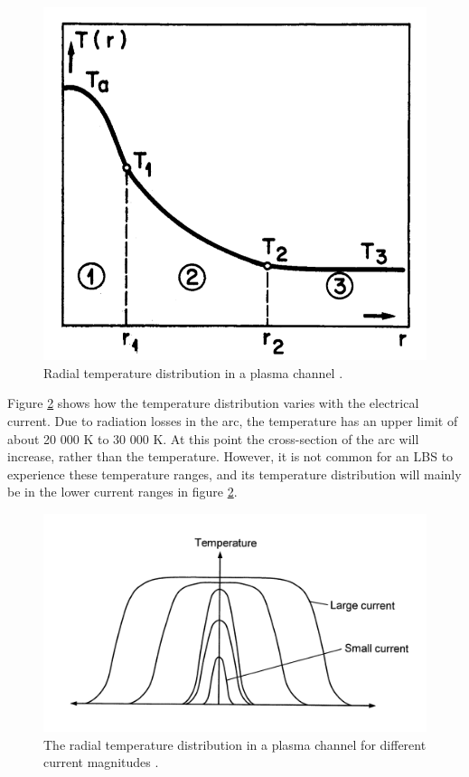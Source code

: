 \documentclass[10pt,b5paper,twoside]{article}
\begin{document}
\begin{figure}[H]
\centering
\includegraphics[scale=0.25]{Bilder/Theory/tempZonesArc.png}
\caption{Radial temperature distribution in a plasma channel \cite{bib:TDCIGBB}.} \label{fig:tempDist1}
\end{figure}

Figure \ref{fig:tempDist2} shows how the temperature distribution varies with the electrical current. Due to radiation losses in the arc, the temperature has an upper limit of about 20 000 K to 30 000 K. At this point the cross-section of the arc will increase, rather than the temperature. However, it is not common for an LBS to experience these temperature ranges, and its temperature distribution will mainly be in the lower current ranges in figure \ref{fig:tempDist2}.

\begin{figure}[H]
\centering
\includegraphics[scale=0.85]{Bilder/Theory/plasmaChannel1.png}
\caption{The radial temperature distribution in a plasma channel for different current magnitudes \cite{bib:HVEbreak}.} \label{fig:tempDist2}
\end{figure}
\end{document}
